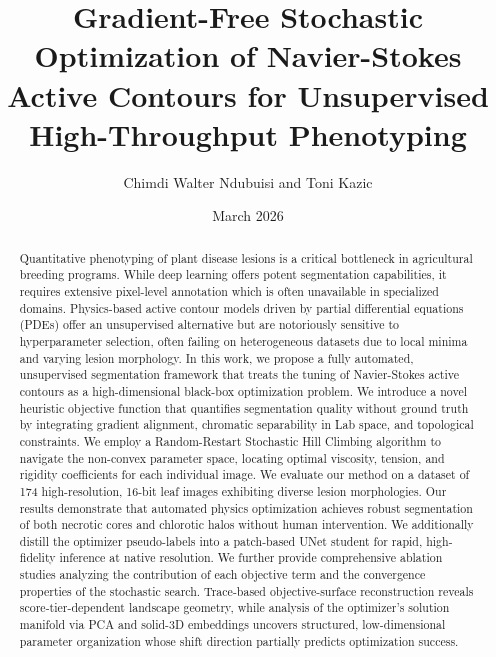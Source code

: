 \documentclass[11pt,a4paper]{article}
\begin{document}
\title{Gradient-Free Stochastic Optimization of Navier-Stokes Active Contours for Unsupervised High-Throughput Phenotyping}

\author{Chimdi Walter Ndubuisi and Toni Kazic}
\date{March 2026}

\maketitle

\begin{abstract}
Quantitative phenotyping of plant disease lesions is a critical bottleneck in agricultural breeding programs. While deep learning offers potent segmentation capabilities, it requires extensive pixel-level annotation which is often unavailable in specialized domains. Physics-based active contour models driven by partial differential equations (PDEs) offer an unsupervised alternative but are notoriously sensitive to hyperparameter selection, often failing on heterogeneous datasets due to local minima and varying lesion morphology. In this work, we propose a fully automated, unsupervised segmentation framework that treats the tuning of Navier-Stokes active contours as a high-dimensional black-box optimization problem. We introduce a novel heuristic objective function that quantifies segmentation quality without ground truth by integrating gradient alignment, chromatic separability in Lab space, and topological constraints. We employ a Random-Restart Stochastic Hill Climbing algorithm to navigate the non-convex parameter space, locating optimal viscosity, tension, and rigidity coefficients for each individual image. We evaluate our method on a dataset of 174 high-resolution, 16-bit leaf images exhibiting diverse lesion morphologies. Our results demonstrate that automated physics optimization achieves robust segmentation of both necrotic cores and chlorotic halos without human intervention. We additionally distill the optimizer pseudo-labels into a patch-based UNet student for rapid, high-fidelity inference at native resolution. We further provide comprehensive ablation studies analyzing the contribution of each objective term and the convergence properties of the stochastic search. Trace-based objective-surface reconstruction reveals score-tier-dependent landscape geometry, while analysis of the optimizer's solution manifold via PCA and solid-3D embeddings uncovers structured, low-dimensional parameter organization whose shift direction partially predicts optimization success.
\end{abstract}
\end{document}
